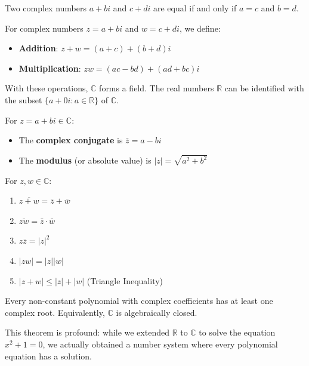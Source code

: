Two complex numbers $a + bi$ and $c + di$ are equal if and only if $a = c$ and $b = d$.

\begin{definition}
For complex numbers $z = a + bi$ and $w = c + di$, we define:
\begin{itemize}
    \item \textbf{Addition}: $z + w = (a + c) + (b + d)i$
    \item \textbf{Multiplication}: $zw = (ac - bd) + (ad + bc)i$
\end{itemize}
\end{definition}

With these operations, $\mathbb{C}$ forms a field. The real numbers $\mathbb{R}$ can be identified with the subset $\{a + 0i : a \in \mathbb{R}\}$ of $\mathbb{C}$.

\begin{definition}
For $z = a + bi \in \mathbb{C}$:
\begin{itemize}
    \item The \textbf{complex conjugate} is $\bar{z} = a - bi$
    \item The \textbf{modulus} (or absolute value) is $|z| = \sqrt{a^2 + b^2}$
\end{itemize}
\end{definition}

\begin{theorem}
For $z, w \in \mathbb{C}$:
\begin{enumerate}
    \item $\overline{z + w} = \bar{z} + \bar{w}$
    \item $\overline{zw} = \bar{z} \cdot \bar{w}$
    \item $z\bar{z} = |z|^2$
    \item $|zw| = |z||w|$
    \item $|z + w| \le |z| + |w|$ (Triangle Inequality)
\end{enumerate}
\end{theorem}

\begin{theorem}
Every non-constant polynomial with complex coefficients has at least one complex root. Equivalently, $\mathbb{C}$ is algebraically closed.
\end{theorem}

This theorem is profound: while we extended $\mathbb{R}$ to $\mathbb{C}$ to solve the equation $x^2 + 1 = 0$, we actually obtained a number system where every polynomial equation has a solution.

